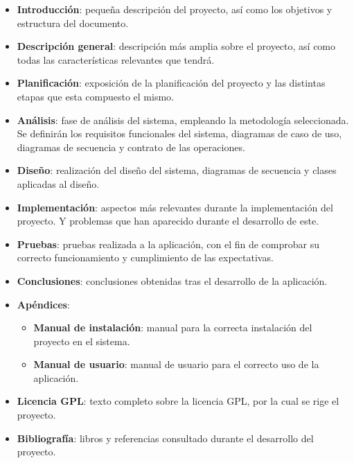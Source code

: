 \begin{itemize}
\item \textbf{Introducción}: pequeña descripción del proyecto, así como los objetivos y estructura del documento.

\item \textbf{Descripción general}: descripción más amplia sobre el proyecto, así como todas las características relevantes
que tendrá.

\item \textbf{Planificación}: exposición de la planificación del proyecto y las distintas etapas que esta compuesto el mismo.

\item \textbf{Análisis}: fase de análisis del sistema, empleando la metodología seleccionada. Se definirán los
requisitos funcionales del sistema, diagramas de caso de uso, diagramas de secuencia y contrato de las operaciones.

\item \textbf{Diseño}: realización del diseño del sistema, diagramas de secuencia y clases aplicadas al diseño.

\item \textbf{Implementación}: aspectos más relevantes durante la implementación del proyecto. Y problemas que han aparecido
durante el desarrollo de este.

\item \textbf{Pruebas}: pruebas realizada a la aplicación, con el fin de comprobar su correcto funcionamiento y
cumplimiento de las expectativas.

\item \textbf{Conclusiones}: conclusiones obtenidas tras el desarrollo de la aplicación.

\item \textbf{Apéndices}:
\begin{itemize}
\item \textbf{Manual de instalación}: manual para la correcta instalación del proyecto en el sistema.
\item \textbf{Manual de usuario}: manual de usuario para el correcto uso de la aplicación.
\end{itemize}

\item \textbf{Licencia GPL}: texto completo sobre la licencia GPL, por la cual se rige el proyecto.

\item \textbf{Bibliografía}: libros y referencias consultado durante el desarrollo del proyecto.

\end{itemize}
